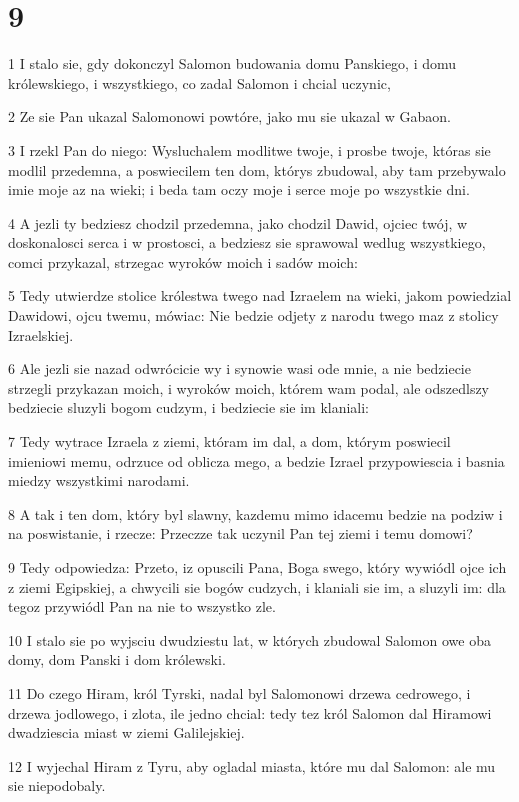 \chapter{9}

\par 1 I stalo sie, gdy dokonczyl Salomon budowania domu Panskiego, i domu królewskiego, i wszystkiego, co zadal Salomon i chcial uczynic,
\par 2 Ze sie Pan ukazal Salomonowi powtóre, jako mu sie ukazal w Gabaon.
\par 3 I rzekl Pan do niego: Wysluchalem modlitwe twoje, i prosbe twoje, któras sie modlil przedemna, a poswiecilem ten dom, którys zbudowal, aby tam przebywalo imie moje az na wieki; i beda tam oczy moje i serce moje po wszystkie dni.
\par 4 A jezli ty bedziesz chodzil przedemna, jako chodzil Dawid, ojciec twój, w doskonalosci serca i w prostosci, a bedziesz sie sprawowal wedlug wszystkiego, comci przykazal, strzegac wyroków moich i sadów moich:
\par 5 Tedy utwierdze stolice królestwa twego nad Izraelem na wieki, jakom powiedzial Dawidowi, ojcu twemu, mówiac: Nie bedzie odjety z narodu twego maz z stolicy Izraelskiej.
\par 6 Ale jezli sie nazad odwrócicie wy i synowie wasi ode mnie, a nie bedziecie strzegli przykazan moich, i wyroków moich, którem wam podal, ale odszedlszy bedziecie sluzyli bogom cudzym, i bedziecie sie im klaniali:
\par 7 Tedy wytrace Izraela z ziemi, któram im dal, a dom, którym poswiecil imieniowi memu, odrzuce od oblicza mego, a bedzie Izrael przypowiescia i basnia miedzy wszystkimi narodami.
\par 8 A tak i ten dom, który byl slawny, kazdemu mimo idacemu bedzie na podziw i na poswistanie, i rzecze: Przeczze tak uczynil Pan tej ziemi i temu domowi?
\par 9 Tedy odpowiedza: Przeto, iz opuscili Pana, Boga swego, który wywiódl ojce ich z ziemi Egipskiej, a chwycili sie bogów cudzych, i klaniali sie im, a sluzyli im: dla tegoz przywiódl Pan na nie to wszystko zle.
\par 10 I stalo sie po wyjsciu dwudziestu lat, w których zbudowal Salomon owe oba domy, dom Panski i dom królewski.
\par 11 Do czego Hiram, król Tyrski, nadal byl Salomonowi drzewa cedrowego, i drzewa jodlowego, i zlota, ile jedno chcial: tedy tez król Salomon dal Hiramowi dwadziescia miast w ziemi Galilejskiej.
\par 12 I wyjechal Hiram z Tyru, aby ogladal miasta, które mu dal Salomon: ale mu sie niepodobaly.
